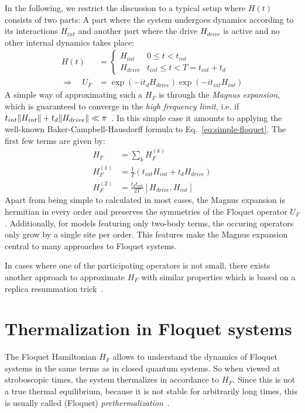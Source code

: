 In the following, we restrict the discussion to a typical setup where $H(t)$ consists of two parts: A part where the system undergoes dynamics according to its interactions $H_{int}$ and another part where the drive $H_{drive}$ is active and no other internal dynamics takes place:
\begin{align}
	H(t) &= \begin{cases}
		H_{int} & 0 \leq t < t_{int}\\
		H_{drive} & t_{int} \leq t < T=t_{int}+t_{d}
	\end{cases}\\
\Rightarrow\quad U_F &= \exp\left(-it_{d}H_{drive}\right)\exp\left(-it_{int}H_{int}\right) \label{eq:simple-floquet}
\end{align}
A simple way of approximating such a $H_F$ is through the \emph{Magnus expansion}, which is guaranteed to converge in the \emph{high frequency limit}, i.e. if $t_{int}\lVert H_{int}\rVert+t_{d}\lVert H_{drive}\rVert \ll \pi $~\cite{blanesMagnusExpansionIts2009}. In this simple case it amounts to applying the well-known Baker-Campbell-Hausdorff formula to Eq.~\ref{eq:simple-floquet}. The first few terms are given by:
\begin{align}
	H_F &= \sum_k H_F^{(k)}\\
	H_F^{(1)} &= \frac{1}{T}\left(t_{int} H_{int} + t_{d}H_{drive}\right)\\
	H_F^{(2)} &= \frac{t_{d}t_{int}}{2T} \left[H_{drive}, H_{int}\right]
\end{align}
Apart from being simple to calculated in most cases, the Magnus expansion is hermitian in every order and preserves the symmetries of the Floquet operator $U_F$. Additionally, for models featuring only two-body terms, the occuring operators only grow by a single site per order. This features make the Magnus expansion central to many approaches to Floquet systems.

In cases where one of the participating operators is not small, there exists another approach to approximate $H_F$ with similar properties which is based on a replica resummation trick~\cite{vajnaReplicaResummationBakerCampbellHausdorff2018}.

\section{Thermalization in Floquet systems}

The Floquet Hamiltonian $H_F$ allows to understand the dynamics of Floquet systems in the same terms as in closed quantum systems. So when viewed at stroboscopic times, the system thermalizes in accordance to $H_F$. Since this is not a true thermal equilibrium, because it is not stable for arbitrarily long times, this is usually called (Floquet) \emph{prethermalization}~\cite{moriThermalizationPrethermalizationIsolated2018}.

